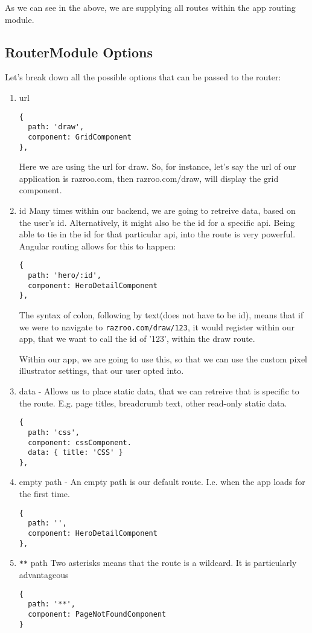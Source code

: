 As we can see in the above, we are supplying all routes within the app routing
module.

\subsection{ RouterModule Options }
Let's break down all the possible options that can be passed to the router:
\begin{enumerate}
\item url
\begin{lstlisting}
{
  path: 'draw',
  component: GridComponent
},
\end{lstlisting}
Here we are using the url for draw. So, for instance, let's say the url
of our application is razroo.com, then razroo.com/draw, will display
the grid component.
\item id
Many times within our backend, we are going to retreive data, based on the 
user's id. Alternatively, it might also be the id for a specific api. Being
able to tie in the id for that particular api, into the route is very 
powerful. Angular routing allows for this to happen: 
\begin{lstlisting}
{
  path: 'hero/:id', 
  component: HeroDetailComponent 
},
\end{lstlisting}
The syntax of colon, following by text(does not have to be id), means that 
if we were to navigate to \lstinline{razroo.com/draw/123}, it would 
register within our app, that we want to call the id of '123', within
the draw route. 

Within our app, we are going to use this, so that we can use the custom 
pixel illustrator settings, that our user opted into. 
\item data - Allows us to place static data, that we can retreive that is 
specific to the route. E.g. page titles, breadcrumb text, other read-only 
static data.
\begin{lstlisting}
{
  path: 'css', 
  component: cssComponent.
  data: { title: 'CSS' }
},
\end{lstlisting}
\item empty path - An empty path is our default route. I.e. when the app 
loads for the first time. 
\begin{lstlisting}
{
  path: '', 
  component: HeroDetailComponent 
},
\end{lstlisting}
\item \lstinline{**} path
Two asterisks means that the route is a wildcard. It is particularly 
advantageous 
\begin{lstlisting}
{
  path: '**',
  component: PageNotFoundComponent 
}
\end{lstlisting}
\end{enumerate}

